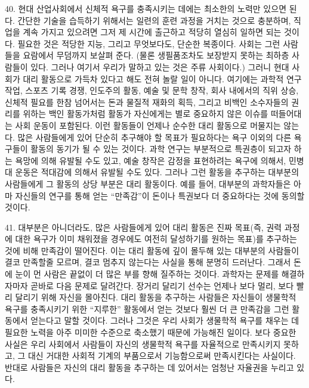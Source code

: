 \documentclass[11pt,a4paper]{article}
\begin{document}
\begin{multicols}{2}
40. 현대 산업사회에서 신체적 욕구를 충족시키는 데에는 최소한의 노력만 있으면 된다. 간단한 기술을  습득하기 위해서는 일련의 훈련 과정을 거치는 것으로 충분하며, 직업을 계속 가지고 있으려면 그저 제  시간에 출근하고 적당히 열심히 일하면 되는 것이다. 필요한 것은 적당한 지능, 그리고 무엇보다도,  단순한 복종이다. 사회는 그런 사람들을 요람에서 무덤까지 보살펴 준다. (물론 생필품조차도 보장받지  못하는 최하층 사람들이 있다. 그러나 여기서 우리가 말하고 있는 것은 주류 사회이다.) 그러니 현대  사회가 대리 활동으로 가득차 있다고 해도 전혀 놀랄 일이 아니다. 여기에는 과학적 연구작업, 스포츠 기록 경쟁, 인도주의 활동, 예술 및 문학 창작, 회사 내에서의 직위 상승, 신체적 필요를 한참 넘어서는  돈과 물질적 재화의 획득, 그리고 비백인 소수자들의 권리를 위하는 백인 활동가처럼 활동가 자신에게는  별로 중요하지 않은 이슈를 떠들어대는 사회 운동이 포함된다. 이런 활동들이 언제나 순수한 대리  활동으로 머물지는 않는다. 많은 사람들에게 있어 단순히 추구해야 할 목표가 필요하다는 욕구 이외의  다른 욕구들이 활동의 동기가 될 수 있는 것이다. 과학 연구는 부분적으로 특권층이 되고자 하는 욕망에  의해 유발될 수도 있고, 예술 창작은 감정을 표현하려는 욕구에 의해서, 민병대 운동은 적대감에 의해서  유발될 수도 있다. 그러나 그런 활동을 추구하는 대부분의 사람들에게 그 활동의 상당 부분은 대리  활동이다. 예를 들어, 대부분의 과학자들은 아마 자신들의 연구를 통해 얻는 “만족감”이 돈이나 특권보다  더 중요하다는 것에 동의할 것이다. 


41. 대부분은 아니더라도, 많은 사람들에게 있어 대리 활동은 진짜 목표(즉, 권력 과정에 대한 욕구가  이미 채워졌을 경우에도 여전히 달성하기를 원하는 목표)를 추구하는 것에 비해 만족감이 떨어진다. 이는  대리 활동에 깊이 몰두해 있는 대부분의 사람들이 결코 만족할줄 모르며, 결코 멈추지 않는다는 사실을  통해 분명히 드러난다. 그래서 돈에 눈이 먼 사람은 끝없이 더 많은 부를 향해 질주하는 것이다. 과학자는  문제를 해결하자마자 곧바로 다음 문제로 달려간다. 장거리 달리기 선수는 언제나 보다 멀리, 보다 빨리  달리기 위해 자신을 몰아친다. 대리 활동을 추구하는 사람들은 자신들이 생물학적 욕구를 충족시키기  위한 “지루한” 활동에서 얻는 것보다 훨씬 더 큰 만족감을 그런 활동에서 얻는다고 말할 것이다. 그러나  그것은 우리 사회가 생물학적 욕구를 채우는 데 필요한 노력을 아주 미미한 수준으로 축소했기 때문에  가능해진 일이다. 보다 중요한 사실은 우리 사회에서 사람들이 자신의 생물학적 욕구를 자율적으로  만족시키지 못하고, 그 대신 거대한 사회적 기계의 부품으로서 기능함으로써 만족시킨다는 사실이다.  반대로 사람들은 자신의 대리 활동을 추구하는 데 있어서는 엄청난 자율권을 누리고 있다. 



\end{multicols}
\end{document}
